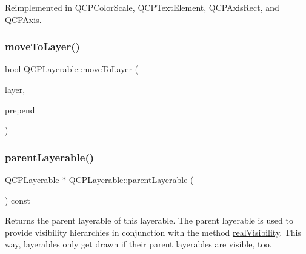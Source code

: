 Reimplemented in \hyperlink{class_q_c_p_color_scale_a6a35dd39ab4e5cb2d7b29ebb4d5b61b0}{Q\+C\+P\+Color\+Scale}, \hyperlink{class_q_c_p_text_element_acfcbaf9b1da18745e72726aafb39c855}{Q\+C\+P\+Text\+Element}, \hyperlink{class_q_c_p_axis_rect_a6c89b988d3a0b93c0878f0ebdb5037f4}{Q\+C\+P\+Axis\+Rect}, and \hyperlink{class_q_c_p_axis_a35663b938ad83e91c0b8e59dbc8c6b18}{Q\+C\+P\+Axis}.

\mbox{\label{class_q_c_p_layerable_af94484cfb7cbbddb7de522e9be71d9a4}} 
\subsubsection{\texorpdfstring{move\+To\+Layer()}{moveToLayer()}}
{\footnotesize\ttfamily bool Q\+C\+P\+Layerable\+::move\+To\+Layer (\begin{DoxyParamCaption}\item[{\hyperlink{class_q_c_p_layer}{Q\+C\+P\+Layer} $\ast$}]{layer,  }\item[{bool}]{prepend }\end{DoxyParamCaption})\hspace{0.3cm}{\ttfamily [protected]}}

\mbox{\label{class_q_c_p_layerable_aa78b7e644d2c519e1a9a6f2ac5fcd858}} 
\subsubsection{\texorpdfstring{parent\+Layerable()}{parentLayerable()}}
{\footnotesize\ttfamily \hyperlink{class_q_c_p_layerable}{Q\+C\+P\+Layerable} $\ast$ Q\+C\+P\+Layerable\+::parent\+Layerable (\begin{DoxyParamCaption}{ }\end{DoxyParamCaption}) const\hspace{0.3cm}{\ttfamily [inline]}}

Returns the parent layerable of this layerable. The parent layerable is used to provide visibility hierarchies in conjunction with the method \hyperlink{class_q_c_p_layerable_ab054e88f15d485defcb95e7376f119e7}{real\+Visibility}. This way, layerables only get drawn if their parent layerables are visible, too.

